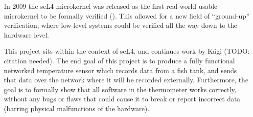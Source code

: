 \documentclass[twoside]{memoir}
\begin{document}
In 2009 the seL4 microkernel was released as the first real-world usable
microkernel to be formally verified (\cite{Klein2014Verification}).
This allowed for a new field of ``ground-up'' verification,
where low-level systems could be verified all the way down to the hardware level.

This project sits within the context of seL4, and
continues work by K{\"a}gi (TODO: citation needed).
The end goal of this project is to produce a fully functional
networked temperature sensor which records data from a fish tank,
and sends that data over the network where it will be recorded externally.
Furthermore, the goal is to formally show that all software in the
thermometer works correctly, without any bugs or flaws that could cause
it to break or report incorrect data (barring physical malfunctions of the hardware).
\end{document}
